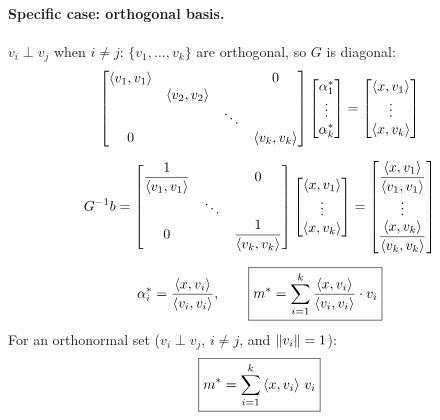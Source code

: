 \paragraph{Specific case: orthogonal basis.}
$v_i\perp v_j$ when $i\neq j$: \quad $\{v_1,\dots,v_k\}$ are orthogonal, so $G$ is diagonal:
\begin{gather*}
\bmat{\inner{v_1}{v_1} & & & 0\\ & \inner{v_2}{v_2} & & \\ & & \ddots & \\ 0 & & & \inner{v_k}{v_k}}
\bmat{\alpha_1^*\\ \vdots\\ \alpha_k^*} = \bmat{\inner{x}{v_1}\\ \vdots\\ \inner{x}{v_k}}\\[6pt]
G^{-1}b = \bmat{\dfrac{1}{\inner{v_1}{v_1}} & & 0\\ & \ddots & \\ 0 & & \dfrac{1}{\inner{v_k}{v_k}}}
\bmat{\inner{x}{v_1}\\ \vdots\\ \inner{x}{v_k}}
= \bmat{\dfrac{\inner{x}{v_1}}{\inner{v_1}{v_1}}\\ \vdots\\ \dfrac{\inner{x}{v_k}}{\inner{v_k}{v_k}}}\\[6pt]
\alpha_i^* = \frac{\inner{x}{v_i}}{\inner{v_i}{v_i}}, \qquad
\boxed{m^* = \sum_{i=1}^k \frac{\inner{x}{v_i}}{\inner{v_i}{v_i}}\cdot v_i}
\end{gather*}
For an orthonormal set ($v_i\perp v_j$, $i\neq j$, and $\norm{v_i}=1$):
\begin{gather*}
\boxed{m^* = \sum_{i=1}^k \inner{x}{v_i}\, v_i}
\end{gather*}

